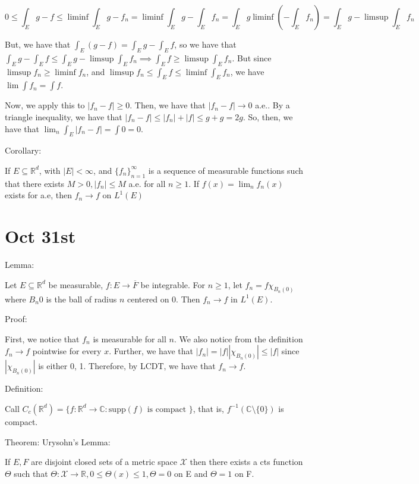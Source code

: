 \documentclass[10pt]{article}
\begin{document}
$$ 0 \leq \int_E g - f \leq \liminf \int_E g - f_n = \liminf \int_E g - \int_E f_n = \int_E g \liminf ( - \int_E f_n) = \int_E g - \limsup \int_E f_n $$ 

But, we have that $\int_E (g-f) = \int_E g - \int_E f$, so we have that $\int_E g - \int_E f \leq \int_E g - \limsup \int_E f_n \implies \int_E f \geq \limsup \int_E f_n$. But since $\limsup f_n \geq \liminf f_n$, and $ \limsup f_n \leq \int_E f \leq \liminf \int_E f_n$, we have $\lim \int f_n = \int f$.

Now, we apply this to $| f_n - f| \geq 0$. Then, we have that $| f_n  - f | \to 0$ a.e.. By a triangle inequality, we have that $| f_n - f| \leq |f_n| + |f| \leq g + g = 2g$. So, then, we have that $\lim_n \int_E | f_n - f| = \int 0 = 0$.

Corollary:

If $E \subseteq \mathbb{R}^d$, with $|E| < \infty$, and $\{ f_n \}_{n=1}^\infty$ is a sequence of measurable functions such that there exists $M > 0, |f_n| \leq M$ a.e. for all $n \geq 1$. If $f(x) = \lim_n f_n(x)$ exists for a.e, then $f_n \to f$ on $L^1(E)$

\section*{Oct 31st}

Lemma: 

Let $E \subseteq \mathbb{R}^d$ be measurable, $f: E \to \overline{F}$ be integrable. For $n \geq 1$, let $f_n = f \chi_{B_n(0)}$ where $B_n{0}$ is the ball of radius $n$ centered on $0$. Then $f_n \to f$ in $L^1(E)$.

Proof:

First, we notice that $f_n$ is measurable for all $n$. We also notice from the definition $f_n \to f$ pointwise for every $x$. Further, we have that $|f_n| = |f| |\chi_{B_n(0)}| \leq |f|$ since $|\chi_{B_n(0)}|$ is either 0, 1. Therefore, by LCDT, we have that $f_n \to f$.

Definition:

Call $C_c(\mathbb{R}^d) = \{ f: \mathbb{R}^d \to \mathbb{C} : \text{supp}(f) \text{ is compact } \}$, that is, $f^{-1}(\mathbb{C} \setminus \{ 0 \})$ is compact.

Theorem: Urysohn’s Lemma:

If $E, F$ are disjoint closed sets of a metric space $\mathcal{X}$ then there exists a cts function $\Theta$ such that $\Theta: \mathcal{X} \to \mathbb{R}, 0 \leq \Theta(x) \leq 1, \Theta = 0$ on E and $\Theta = 1$ on F.
\end{document}

